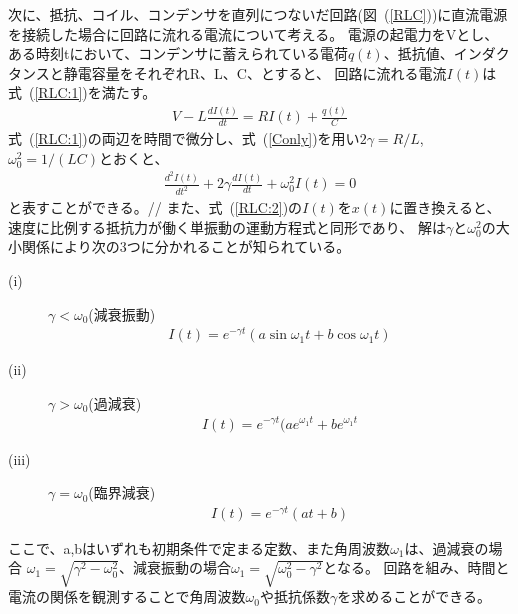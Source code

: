 \documentclass[a4j,10pt]{jarticle}
\newcommand{\Equref}[1]{式~(\ref{#1})}
\newcommand{\Figref}[1]{図~(\ref{#1})}
\begin{document}
次に、抵抗、コイル、コンデンサを直列につないだ回路(\Figref{RLC})に直流電源を接続した場合に回路に流れる電流について考える。
電源の起電力をVとし、ある時刻tにおいて、コンデンサに蓄えられている電荷$q(t)$、抵抗値、インダクタンスと静電容量をそれぞれR、L、C、とすると、
回路に流れる電流$I(t)$は\Equref{RLC:1}を満たす。
\begin{eqnarray}
\label{RLC:1}
V-L\frac{dI(t)}{dt}=RI(t)+\frac{q(t)}{C}
\end{eqnarray}
\Equref{RLC:1}の両辺を時間で微分し、\Equref{Conly}を用い$2\gamma=R/L$,$\omega_{0}^{2}=1/(LC)$とおくと、
\begin{eqnarray}
\label{RLC:2}
\frac{d^2I(t)}{dt^{2}}+2\gamma\frac{dI(t)}{dt}+\omega_{0}^{2}I(t)=0
\end{eqnarray}
と表すことができる。//
また、\Equref{RLC:2}の$I(t)$を$x(t)$に置き換えると、速度に比例する抵抗力が働く単振動の運動方程式と同形であり、
解は$\gamma$と$\omega_{0}^{2}$の大小関係により次の3つに分かれることが知られている。
\begin{description}
\item[(i)]$\gamma<\omega_{0}$(減衰振動)
\begin{eqnarray}
\label{freq}
				I(t)=e^{-{\gamma}t}(a\sin\omega_{1}t+b\cos\omega_{1}t)
\end{eqnarray}
\item[(ii)]$\gamma>\omega_{0}$(過減衰)
\begin{eqnarray}
\label{over}
				I(t)=e^{-{\gamma}t}(ae^{\omega_{1}t}+be^{\omega_{1}t}
\end{eqnarray}
\item[(iii)]$\gamma=\omega_{0}$(臨界減衰)
\begin{eqnarray}
\label{critical}
				I(t)=e^{-{\gamma}t}(at+b)
\end{eqnarray}
\end{description}

ここで、a,bはいずれも初期条件で定まる定数、また角周波数$\omega_{1}$は、過減衰の場合
$\omega_{1}=\sqrt{\gamma^{2}-\omega_{0}^{2}}$、減衰振動の場合$\omega_{1}=\sqrt{\omega_{0}^{2}-\gamma^{2}}$となる。
回路を組み、時間と電流の関係を観測することで角周波数$\omega_{0}$や抵抗係数$\gamma$を求めることができる。
\end{document}
